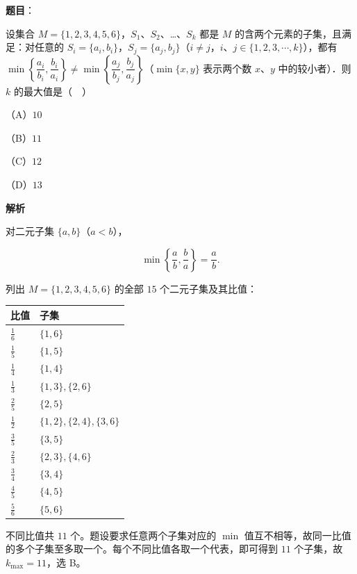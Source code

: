\begin{answer}

\textbf{题目}：

设集合 $M=\{1,2,3,4,5,6\}$，$S_1$、$S_2$、…、$S_k$ 都是 $M$ 的含两个元素的子集，且满足：对任意的 $S_i=\{a_i,b_i\}$，$S_j=\{a_j,b_j\}$（$i\neq j$，$i$、$j\in\{1,2,3,\cdots,k\}$），都有 $\min\left\{\dfrac{a_i}{b_i},\dfrac{b_i}{a_i}\right\}\neq\min\left\{\dfrac{a_j}{b_j},\dfrac{b_j}{a_j}\right\}$（$\min\{x,y\}$ 表示两个数 $x$、$y$ 中的较小者）．则 $k$ 的最大值是（　）

（A）$10$

（B）$11$

（C）$12$

（D）$13$

\textbf{解析}

对二元子集 $\{a,b\}$（$a<b$），

\nopagebreak[4]
\[\min\left\{\frac ab,\frac ba\right\}=\frac ab .\]

列出 $M=\{1,2,3,4,5,6\}$ 的全部 $15$ 个二元子集及其比值：

\begin{center}
\begin{tabular}{ll}
\toprule
比值 & 子集 \\
\midrule
$\frac16$ & $\{1,6\}$ \\
$\frac15$ & $\{1,5\}$ \\
$\frac14$ & $\{1,4\}$ \\
$\frac13$ & $\{1,3\},\{2,6\}$ \\
$\frac25$ & $\{2,5\}$ \\
$\frac12$ & $\{1,2\},\{2,4\},\{3,6\}$ \\
$\frac35$ & $\{3,5\}$ \\
$\frac23$ & $\{2,3\},\{4,6\}$ \\
$\frac34$ & $\{3,4\}$ \\
$\frac45$ & $\{4,5\}$ \\
$\frac56$ & $\{5,6\}$ \\
\bottomrule
\end{tabular}
\end{center}

不同比值共 $11$ 个。题设要求任意两个子集对应的 $\min$ 值互不相等，故同一比值的多个子集至多取一个。每个不同比值各取一个代表，即可得到 $11$ 个子集，故 $k_{\max}=11$，选 B。


\end{answer}
